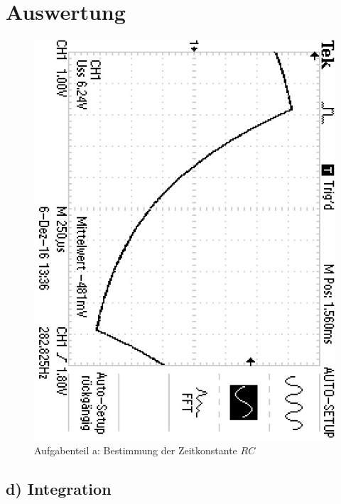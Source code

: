 \section{Auswertung}
\label{sec:Auswertung}

\begin{figure}
	\centering
	\includegraphics[angle=90]{bilder/F0000TEK.JPG}
	\caption{Aufgabenteil a: Bestimmung der Zeitkonstante $RC$}
	\label{fig:plotrc}
\end{figure}

\subsection{d) Integration}

